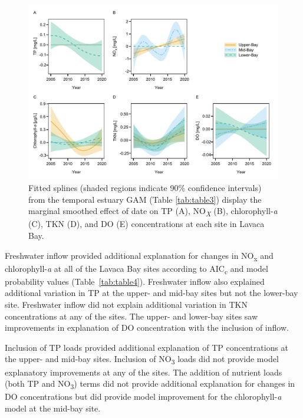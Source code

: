 \documentclass[fleqn,10pt,lineno]{wlpeerj} %
\begin{document}
\begin{figure}

{\centering \includegraphics[width=1\linewidth,]{Schramm-2023-08-PeerJ_files/figure-latex/fig5} 

}

\caption{Fitted splines (shaded regions indicate 90\% confidence intervals) from the temporal estuary GAM (Table \ref{tab:table3}) display the marginal smoothed effect of date on TP (A), NO\textit{\textsubscript{X}} (B), chlorophyll-\textit{a} (C), TKN (D), and DO (E) concentrations at each site in Lavaca Bay.}\label{fig:fig5}
\end{figure}

Freshwater inflow provided additional explanation for changes in
NO\textsubscript{x} and chlorophyll-\emph{a} at all of the Lavaca Bay
sites according to AIC\textsubscript{c} and model probability values
(Table~\ref{tab:table4}). Freshwater inflow also explained additional
variation in TP at the upper- and mid-bay sites but not the lower-bay
site. Freshwater inflow did not explain additional variation in TKN
concentrations at any of the sites. The upper- and lower-bay sites saw
improvements in explanation of DO concentration with the inclusion of
inflow.

Inclusion of TP loads provided additional explanation of TP
concentrations at the upper- and mid-bay sites. Inclusion of
NO\textsubscript{3} loads did not provide model explanatory improvements
at any of the sites. The addition of nutrient loads (both TP and
NO\textsubscript{3}) terms did not provide additional explanation for
changes in DO concentrations but did provide model improvement for the
chlorophyll-\emph{a} model at the mid-bay site.
\end{document}
